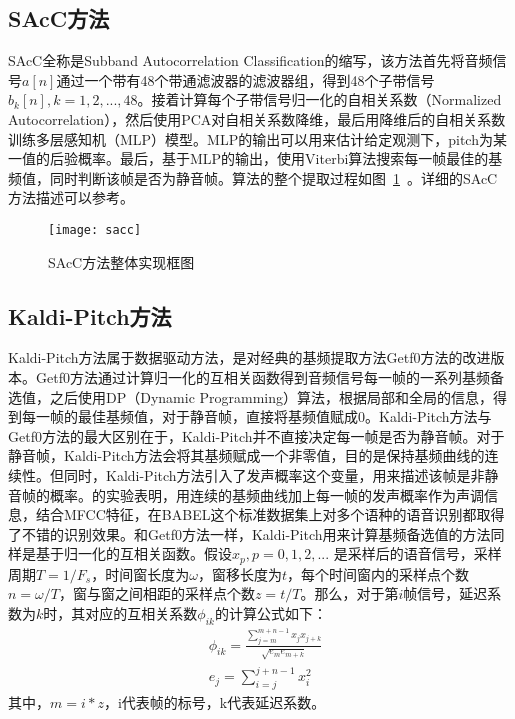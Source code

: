 \subsection{SAcC方法}
SAcC全称是Subband Autocorrelation Classification的缩写，该方法首先将音频信号$a[n]$通过一个带有48个带通滤波器的滤波器组，得到48个子带信号$b_k[n],k=1,2,...,48$。接着计算每个子带信号归一化的自相关系数（Normalized Autocorrelation），然后使用PCA对自相关系数降维，最后用降维后的自相关系数训练多层感知机（MLP）模型。MLP的输出可以用来估计给定观测下，pitch为某一值的后验概率。最后，基于MLP的输出，使用Viterbi算法搜索每一帧最佳的基频值，同时判断该帧是否为静音帧。算法的整个提取过程如图~\ref{fig:sacc}~。详细的SAcC 方法描述可以参考\cite{lee2012noise}。
\begin{figure}[htbp]
\centering
\texttt{[image: sacc]}
\caption{SAcC方法整体实现框图\cite{lee2012noise}}\label{fig:sacc}
\vspace{\baselineskip}
\end{figure}

\subsection{Kaldi-Pitch方法}
Kaldi-Pitch方法\cite{ghahremani2014pitch}属于数据驱动方法，是对经典的基频提取方法Getf0方法\cite{kleijn1995robust}的改进版本。Getf0方法通过计算归一化的互相关函数得到音频信号每一帧的一系列基频备选值，之后使用DP（Dynamic Programming）算法，根据局部和全局的信息，得到每一帧的最佳基频值，对于静音帧，直接将基频值赋成0。Kaldi-Pitch方法与Getf0方法的最大区别在于，Kaldi-Pitch并不直接决定每一帧是否为静音帧。对于静音帧，Kaldi-Pitch方法会将其基频赋成一个非零值，目的是保持基频曲线的连续性。但同时，Kaldi-Pitch方法引入了发声概率这个变量，用来描述该帧是非静音帧的概率。\cite{ghahremani2014pitch}的实验表明，用连续的基频曲线加上每一帧的发声概率作为声调信息，结合MFCC特征，在BABEL这个标准数据集上对多个语种的语音识别都取得了不错的识别效果。和Getf0方法一样，Kaldi-Pitch用来计算基频备选值的方法同样是基于归一化的互相关函数。假设$x_p,p=0,1,2,...$ 是采样后的语音信号，采样周期$T=1/F_s$，时间窗长度为$\omega$，窗移长度为$t$，每个时间窗内的采样点个数$n=\omega/T$，窗与窗之间相距的采样点个数$z=t/T$。那么，对于第$i$帧信号，延迟系数为$k$时，其对应的互相关系数$\phi_{ik}$的计算公式如下：
\begin{eqnarray}
  &\phi_{ik}=\frac{\sum_{j=m}^{m+n-1} x_j x_{j+k}}{\sqrt{e_m e_{m+k}}} \\
  &e_j=\sum_{i=j}^{j+n-1} x_i^2
\end{eqnarray}
其中，$m=i*z$，i代表帧的标号，k代表延迟系数。

